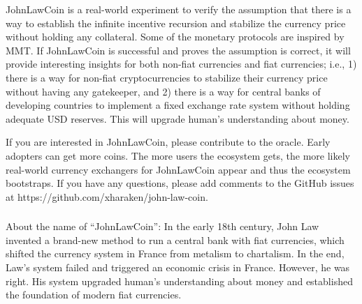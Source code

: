\documentclass[dvipdfmx,a4paper]{article}
\begin{document}
JohnLawCoin is a real-world experiment to verify the assumption that there is a way to establish the infinite incentive recursion and stabilize the currency price without holding any collateral. Some of the monetary protocols are inspired by MMT. If JohnLawCoin is successful and proves the assumption is correct, it will provide interesting insights for both non-fiat currencies and fiat currencies; i.e., 1) there is a way for non-fiat cryptocurrencies to stabilize their currency price without having any gatekeeper, and 2) there is a way for central banks of developing countries to implement a fixed exchange rate system without holding adequate USD reserves. This will upgrade human's understanding about money.

If you are interested in JohnLawCoin, please contribute to the oracle. Early adopters can get more coins. The more users the ecosystem gets, the more likely real-world currency exchangers for JohnLawCoin appear and thus the ecosystem bootstraps. If you have any questions, please add comments to the GitHub issues at https://github.com/xharaken/john-law-coin.

\subsubsection*{}

About the name of ``JohnLawCoin'': In the early 18th century, John Law~\cite{davies2010history,ferguson2008ascent,iwai1997evolution} invented a brand-new method to run a central bank with fiat currencies, which shifted the currency system in France from metalism to chartalism. In the end, Law's system failed and triggered an economic crisis in France. However, he was right. His system upgraded human's understanding about money and established the foundation of modern fiat currencies.



\end{document}
